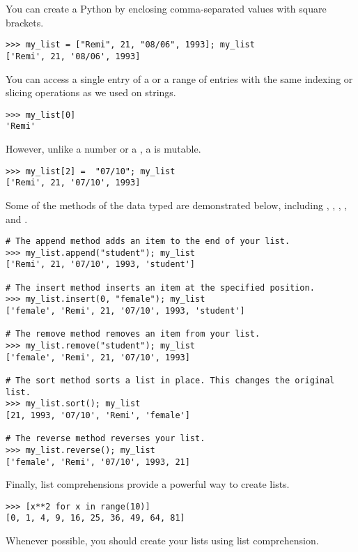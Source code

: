 \begin{example}
You can create a Python  by enclosing comma-separated values with square brackets. 
\begin{lstlisting}
>>> my_list = ["Remi", 21, "08/06", 1993]; my_list
['Remi', 21, '08/06', 1993]
\end{lstlisting}
You can access a single entry of a  or a range of entries with the same indexing or slicing operations as we used on strings. 
\begin{lstlisting}
>>> my_list[0]
'Remi'
\end{lstlisting}
However, unlike a number or a , a  is mutable. 
\begin{lstlisting}
>>> my_list[2] =  "07/10"; my_list
['Remi', 21, '07/10', 1993]
\end{lstlisting}
Some of the methods of the  data typed are demonstrated below, including , , , , and .

\begin{lstlisting}
# The append method adds an item to the end of your list.
>>> my_list.append("student"); my_list
['Remi', 21, '07/10', 1993, 'student']

# The insert method inserts an item at the specified position. 
>>> my_list.insert(0, "female"); my_list
['female', 'Remi', 21, '07/10', 1993, 'student']

# The remove method removes an item from your list.
>>> my_list.remove("student"); my_list
['female', 'Remi', 21, '07/10', 1993]

# The sort method sorts a list in place. This changes the original list.
>>> my_list.sort(); my_list
[21, 1993, '07/10', 'Remi', 'female']

# The reverse method reverses your list.
>>> my_list.reverse(); my_list
['female', 'Remi', '07/10', 1993, 21]
\end{lstlisting}

Finally, list comprehensions provide a powerful way to create lists. 
\begin{lstlisting}
>>> [x**2 for x in range(10)]
[0, 1, 4, 9, 16, 25, 36, 49, 64, 81]
\end{lstlisting}

Whenever possible, you should create your lists using list comprehension.
\label{exp:lists}
\end{example}

